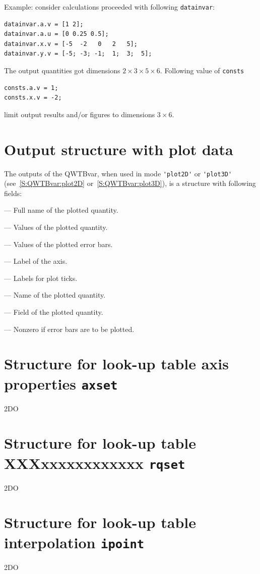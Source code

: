 \documentclass[12pt,a4paper,oneside]{report} %
\newcommand{\li}[1]{\lstinline{#1}}     %
\begin{document}
Example: consider calculations proceeded with following \li{datainvar}:
\begin{lstlisting}
datainvar.a.v = [1 2];
datainvar.a.u = [0 0.25 0.5];
datainvar.x.v = [-5  -2   0   2   5];
datainvar.y.v = [-5; -3; -1;  1;  3;  5];
\end{lstlisting}

The output quantities got dimensions $2\times 3\times 5\times 6$.
Following value of \li{consts}
\begin{lstlisting}
consts.a.v = 1;
consts.x.v = -2;
\end{lstlisting}
limit output results and/or figures to dimensions $3\times 6$.

\section{Output structure with plot data}
\label{S:QWTBvar:plotdata}
The outputs of the QWTBvar, when used in mode \li{'plot2D'} or \li{'plot3D'}
(see~\ref{S:QWTBvar:plot2D} or~\ref{S:QWTBvar:plot3D}), 
is a structure with following fields:
\begin{description}[itemsep=-0.5em]
    \item [\textsf{.name}] --- Full name of the plotted quantity.
    \item [\textsf{.data}] --- Values of the plotted quantity.
    \item [\textsf{.bars}] --- Values of the plotted error bars.
    \item [\textsf{.lbl}] --- Label of the axis.
    \item [\textsf{.ticklbl}] --- Labels for plot ticks.
    \item [\textsf{.Q}] --- Name of the plotted quantity.
    \item [\textsf{.f}] --- Field of the plotted quantity.
    \item [\textsf{.uncbar}] --- Nonzero if error bars are to be plotted.
\end{description}

\section{Structure for look-up table axis properties \tt axset}
2DO %
\section{Structure for look-up table XXXxxxxxxxxxxxx \tt rqset}
2DO %
\section{Structure for look-up table interpolation \tt ipoint}
2DO %
\end{document}
